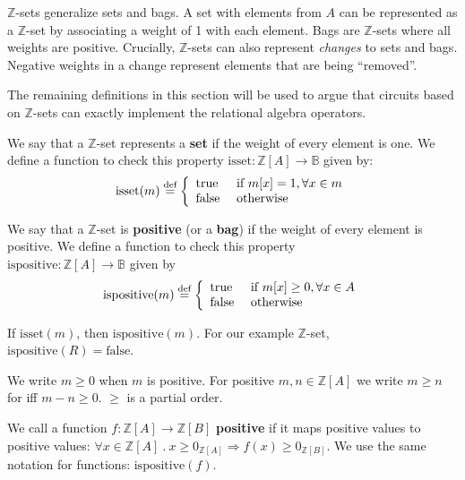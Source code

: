 \documentclass[twocolumn
]{svjour3}
\newif\ifzsetexamples
\numberwithin{equation}{section}
\newcommand{\defined}[1]{\textbf{#1}\index{}}
\newcommand{\zr}{$\Z$-set\xspace}
\newcommand{\zrs}{$\Z$-sets\xspace} %
\newcommand{\Z}{\mathbb{Z}}  %
\newcommand{\B}{\mathbb{B}}  %
\newcommand{\isset}{\mbox{isset}}
\newcommand{\ispositive}{\mbox{ispositive}}
\newcommand{\defn}{\stackrel{\textrm{\scriptsize def}}{=}}
\begin{document}
\zrs generalize sets and bags.  A set with elements from $A$ can be
represented as a \zr by associating a weight of 1 with each element.
Bags are \zrs where all weights are positive.  Crucially, \zrs can
also represent \emph{changes} to sets and bags.  Negative weights in a
change represent elements that are being ``removed''.

The remaining definitions in this section will be used to argue that
circuits based on \zrs can exactly implement the relational algebra
operators.

\begin{definition}
We say that a \zr represents a \defined{set} if the weight of every
element is one.  We define a function to check this property
$\isset : \Z[A] \rightarrow \B$
given by:
$$\isset(m) \defn \left\{
\begin{array}{ll}
  \mbox{true} & \mbox{ if } m[x] = 1, \forall x \in m \\
  \mbox{false} & \mbox{ otherwise}
\end{array}
\right.
$$
\end{definition}

\ifzsetexamples
\noindent For our example $\isset(R) = \mbox{false}$, since $R[\texttt{anne}] = -1$.
\fi

\begin{definition}
We say that a \zr is \defined{positive} (or a \defined{bag}) if the weight of every element is
positive.  We define a function to check this property \\
$\ispositive : \Z[A] \rightarrow \B$
given by
$$\ispositive(m) \defn \left\{
\begin{array}{ll}
  \mbox{true} & \mbox{ if } m[x] \geq 0, \forall x \in A \\
  \mbox{false} & \mbox{ otherwise}
\end{array}
\right.$$
\end{definition}
If $\isset(m)$, then $\ispositive(m)$.  For our example \zr, \\
$\ispositive(R) = \mbox{false}$.

We write $m \geq 0$ when $m$ is positive.  For positive $m, n \in
\Z[A]$ we write $m \geq n$ for iff $m - n \geq 0$.  $\geq$ is a
partial order.

We call a function $f : \Z[A] \rightarrow \Z[B]$ \defined{positive} if it maps
positive values to positive values:
$\forall x \in \Z[A]~.~x \geq 0_{\Z[A]} \Rightarrow f(x) \geq 0_{\Z[B]}$.
We use the same notation for functions: $\ispositive(f)$.
\end{document}
